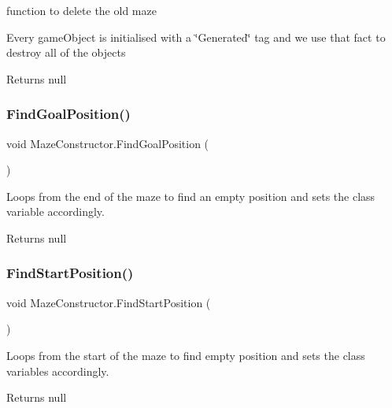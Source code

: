 function to delete the old maze 

Every game\+Object is initialised with a \char`\"{}\+Generated\char`\"{} tag and we use that fact to destroy all of the objects

\begin{DoxyReturn}{Returns}
null 
\end{DoxyReturn}
\mbox{\label{class_maze_constructor_a4c39dbb28528047a9bca89c29dbaf3d3}} 
\subsubsection{\texorpdfstring{FindGoalPosition()}{FindGoalPosition()}}
{\footnotesize\ttfamily void Maze\+Constructor.\+Find\+Goal\+Position (\begin{DoxyParamCaption}{ }\end{DoxyParamCaption})\hspace{0.3cm}{\ttfamily [private]}}



Loops from the end of the maze to find an empty position and sets the class variable accordingly. 

\begin{DoxyReturn}{Returns}
null 
\end{DoxyReturn}
\mbox{\label{class_maze_constructor_a14d31f67a9de9f2351935e29f8d6ee6f}} 
\subsubsection{\texorpdfstring{FindStartPosition()}{FindStartPosition()}}
{\footnotesize\ttfamily void Maze\+Constructor.\+Find\+Start\+Position (\begin{DoxyParamCaption}{ }\end{DoxyParamCaption})\hspace{0.3cm}{\ttfamily [private]}}



Loops from the start of the maze to find empty position and sets the class variables accordingly. 

\begin{DoxyReturn}{Returns}
null 
\end{DoxyReturn}
\mbox{\label{class_maze_constructor_aa6ea3f43b97183943c1f8287cfeb4b6f}} 
